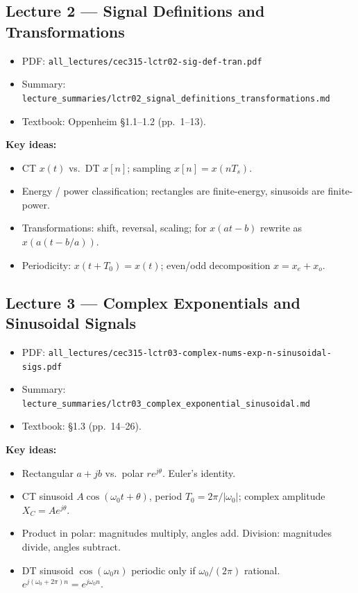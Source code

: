 \documentclass[11pt]{article}
\begin{document}
\subsection{Lecture 2 --- Signal Definitions and Transformations}
\begin{itemize}[leftmargin=*]
  \item PDF: \texttt{all\_lectures/cec315-lctr02-sig-def-tran.pdf}
  \item Summary: \texttt{lecture\_summaries/lctr02\_signal\_definitions\_transformations.md}
  \item Textbook: Oppenheim \S 1.1--1.2 (pp.~1--13).
\end{itemize}
\textbf{Key ideas:}
\begin{itemize}[leftmargin=*]
  \item CT $x(t)$ vs.\ DT $x[n]$; sampling $x[n]=x(nT_s)$.
  \item Energy / power classification; rectangles are finite-energy, sinusoids are finite-power.
  \item Transformations: shift, reversal, scaling; for $x(at-b)$ rewrite as $x(a(t-b/a))$.
  \item Periodicity: $x(t+T_0)=x(t)$; even/odd decomposition $x=x_e+x_o$.
\end{itemize}

\subsection{Lecture 3 --- Complex Exponentials and Sinusoidal Signals}
\begin{itemize}[leftmargin=*]
  \item PDF: \texttt{all\_lectures/cec315-lctr03-complex-nums-exp-n-sinusoidal-sigs.pdf}
  \item Summary: \texttt{lecture\_summaries/lctr03\_complex\_exponential\_sinusoidal.md}
  \item Textbook: \S 1.3 (pp.~14--26).
\end{itemize}
\textbf{Key ideas:}
\begin{itemize}[leftmargin=*]
  \item Rectangular $a+jb$ vs.\ polar $re^{j\theta}$. Euler's identity.
  \item CT sinusoid $A\cos(\omega_0 t+\theta)$, period $T_0=2\pi/|\omega_0|$; complex amplitude $X_C = Ae^{j\theta}$.
  \item Product in polar: magnitudes multiply, angles add. Division: magnitudes divide, angles subtract.
  \item DT sinusoid $\cos(\omega_0 n)$ periodic only if $\omega_0/(2\pi)$ rational. $e^{j(\omega_0+2\pi)n}=e^{j\omega_0 n}$.
\end{itemize}
\end{document}
